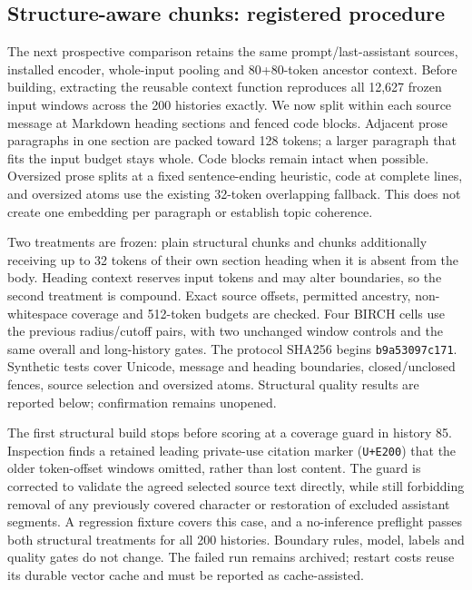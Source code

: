 \documentclass[11pt]{article}
\begin{document}
\subsection{Structure-aware chunks: registered procedure}
The next prospective comparison retains the same prompt/last-assistant sources,
installed encoder, whole-input pooling and 80+80-token ancestor context. Before
building, extracting the reusable context function reproduces all 12,627 frozen
input windows across the 200 histories exactly. We now split within each source
message at Markdown heading sections and fenced code blocks. Adjacent prose
paragraphs in one section are packed toward 128 tokens; a larger paragraph
that fits the input budget stays whole. Code blocks remain intact when possible.
Oversized prose splits at a fixed sentence-ending heuristic, code at complete
lines, and oversized atoms use the existing 32-token overlapping fallback.
This does not create one embedding per paragraph or establish topic coherence.

Two treatments are frozen: plain structural chunks and chunks additionally
receiving up to 32 tokens of their own section heading when it is absent from
the body. Heading context reserves input tokens and may alter boundaries, so
the second treatment is compound. Exact source offsets, permitted ancestry,
non-whitespace coverage and 512-token budgets are checked. Four BIRCH cells
use the previous radius/cutoff pairs, with two unchanged window controls and
the same overall and long-history gates. The protocol SHA256 begins
\texttt{b9a53097c171}. Synthetic tests cover Unicode, message and heading
boundaries, closed/unclosed fences, source selection and oversized atoms.
Structural quality results are reported below; confirmation remains unopened.

The first structural build stops before scoring at a coverage guard in history
85. Inspection finds a retained leading private-use citation marker
(\texttt{U+E200}) that the older token-offset windows omitted, rather than lost
content. The guard is corrected to validate the agreed selected source text
directly, while still forbidding removal of any previously covered character
or restoration of excluded assistant segments. A regression fixture covers this
case, and a no-inference preflight passes both structural treatments for all
200 histories. Boundary rules, model, labels and quality gates do not change.
The failed run remains archived; restart costs reuse its durable vector cache
and must be reported as cache-assisted.
\end{document}
